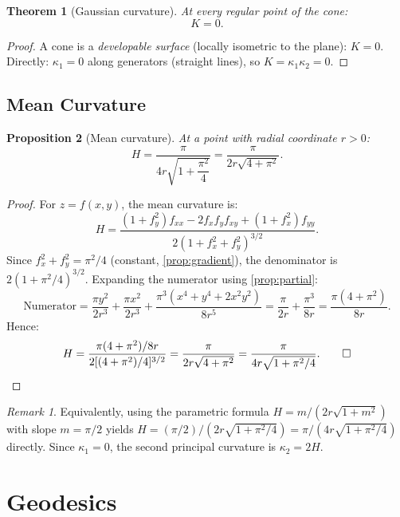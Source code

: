 \documentclass[12pt,a4paper]{article}
\theoremstyle{plain}
\newtheorem{theorem}{Theorem}[section]
\newtheorem{proposition}[theorem]{Proposition}
\theoremstyle{definition}
\theoremstyle{remark}
\newtheorem{remark}{Remark}[section]
\begin{document}
\begin{theorem}[Gaussian curvature]\label{thm:gauss}
At every regular point of the cone:
\[
K = 0.
\]
\end{theorem}

\begin{proof}
A cone is a \emph{developable surface} (locally isometric to the plane): $K=0$.
Directly: $\kappa_1 = 0$ along generators (straight lines), so $K = \kappa_1\kappa_2 = 0$.
\end{proof}

\subsection{Mean Curvature}

\begin{proposition}[Mean curvature]\label{prop:mean_curvature}
At a point with radial coordinate $r>0$:
\begin{equation}\label{eq:mean_curvature}
H = \frac{\pi}{4r\sqrt{1+\dfrac{\pi^2}{4}}} = \frac{\pi}{2r\sqrt{4+\pi^2}}.
\end{equation}
\end{proposition}

\begin{proof}
For $z = f(x,y)$, the mean curvature is:
\[
H = \frac{(1+f_y^2)f_{xx} - 2f_xf_yf_{xy} + (1+f_x^2)f_{yy}}{2(1+f_x^2+f_y^2)^{3/2}}.
\]
Since $f_x^2+f_y^2 = \pi^2/4$ (constant, \cref{prop:gradient}), the denominator
is $2(1+\pi^2/4)^{3/2}$. Expanding the numerator using \cref{prop:partial}:
\[
\text{Numerator} = \frac{\pi y^2}{2r^3}+\frac{\pi x^2}{2r^3}
+\frac{\pi^3(x^4+y^4+2x^2y^2)}{8r^5}
= \frac{\pi}{2r}+\frac{\pi^3}{8r} = \frac{\pi(4+\pi^2)}{8r}.
\]
Hence:
\[
H = \frac{\pi(4+\pi^2)/8r}{2[(4+\pi^2)/4]^{3/2}}
= \frac{\pi}{2r\sqrt{4+\pi^2}} = \frac{\pi}{4r\sqrt{1+\pi^2/4}}. \qed
\]
\end{proof}

\begin{remark}
Equivalently, using the parametric formula $H = m/(2r\sqrt{1+m^2})$ with slope $m=\pi/2$
yields $H = (\pi/2)/(2r\sqrt{1+\pi^2/4}) = \pi/(4r\sqrt{1+\pi^2/4})$ directly.
Since $\kappa_1=0$, the second principal curvature is $\kappa_2 = 2H$.
\end{remark}

\section{Geodesics}
\end{document}
